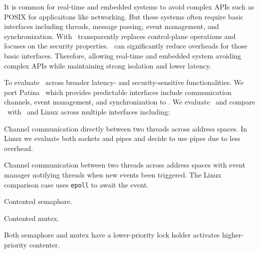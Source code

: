 It is common for real-time and embedded systems to avoid complex APIs such as POSIX for applicaitons like networking.
But these systems often require basic interfaces including threads, message passing, event management, and synchronization.
With \name\ transparently replaces control-plane operations and focuses on the security properties.
\name\ can significantly reduce overheads for those basic interfaces.
Therefore, allowing real-time and embedded system avoiding complex APIs while maintaining strong isolation and lower latency.

To evaluate \name\ across broader latency- and security-sensitive functionalities.
We port Patina~\cite{patina} which provides predictable interfaces include communication channels, event management, and synchronization to \name .
We evaluate \name\ and compare \name\ with \cos\ and Linux across multiple interfaces including: 
\begin{inparaenum}[(1)]
\item Channel communication directly between two threads across address spaces.
	In Linux we evaluate both sockets and pipes and decide to use pipes due to less overhead.
\item Channel communication between two threads across address spaces with event manager notifying threads when new events been triggered.
	The Linux comparison case uses {\tt epoll} to await the event.
\item Contented semaphore.
\item Contented mutex.
\end{inparaenum}
Both semaphore and mutex have a lower-priority lock holder activates higher-priority contenter.


